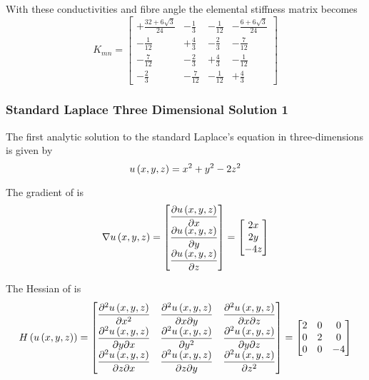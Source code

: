 With these conductivities and fibre angle the elemental stiffness matrix becomes
\begin{equation}
  K_{mn}=\begin{bmatrix}
  +\frac{32+6\sqrt{3}}{24} & -\frac{1}{3} & -\frac{1}{12} & -\frac{6+6\sqrt{3}}{24} \\
  -\frac{1}{12} & +\frac{4}{3} & -\frac{2}{3} & -\frac{7}{12} \\
  -\frac{7}{12} & -\frac{2}{3} & +\frac{4}{3} & -\frac{1}{12} \\
  -\frac{2}{3} & -\frac{7}{12} & -\frac{1}{12} & +\frac{4}{3}
  \end{bmatrix} 
\end{equation}


\subsubsection{Standard Laplace Three Dimensional Solution 1}

The first analytic solution to the standard Laplace's equation in three-dimensions is given by
\begin{equation}
  \fnof{u}{x,y,z}=x^{2}+y^{2}-2z^{2}
  \label{eqn:StandardLaplaceThreeDAnalytic1}
\end{equation}

The gradient of  is
\begin{equation}
  \gradient{}{\fnof{u}{x,y,z}}=\begin{bmatrix}
  \delby{\fnof{u}{x,y,z}}{x} \\
  \delby{\fnof{u}{x,y,z}}{y} \\
  \delby{\fnof{u}{x,y,z}}{z}
  \end{bmatrix}=\begin{bmatrix}
  2x \\
  2y \\
  -4z
  \end{bmatrix}
  \label{eqn:StandardLaplaceThreeDAnalyticGradient1}
\end{equation}

The Hessian of  is
\begin{equation}
  \hessian{}{\fnof{u}{x,y,z}}=\begin{bmatrix}
  \deltwosqby{\fnof{u}{x,y,z}}{x} & \deltwoby{\fnof{u}{x,y,z}}{x}{y} & \deltwoby{\fnof{u}{x,y,z}}{x}{z} \\
  \deltwoby{\fnof{u}{x,y,z}}{y}{x} & \deltwosqby{\fnof{u}{x,y,z}}{y} & \deltwoby{\fnof{u}{x,y,z}}{y}{z} \\
  \deltwoby{\fnof{u}{x,y,z}}{z}{x} & \deltwoby{\fnof{u}{x,y,z}}{z}{y} & \deltwosqby{\fnof{u}{x,y,z}}{z}
  \end{bmatrix}=\begin{bmatrix}
  2 & 0 & 0 \\
  0 & 2 & 0 \\
  0 & 0 & -4 \\
  \end{bmatrix}
  \label{eqn:StandardLaplaceThreeDAnalyticHessian1}
\end{equation}

